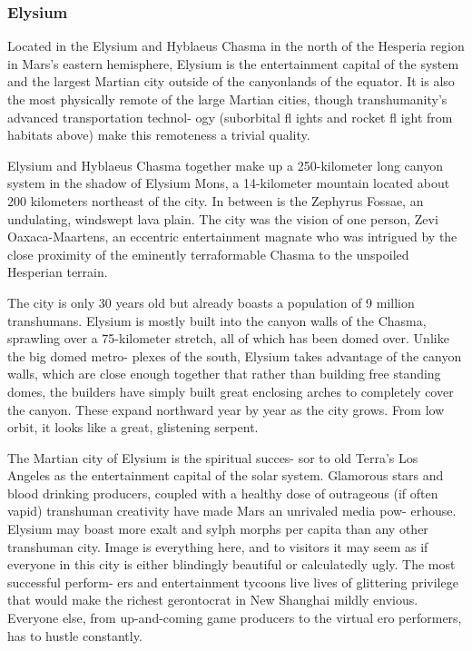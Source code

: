 \subsubsection{Elysium}

Located in the Elysium and Hyblaeus Chasma in 
the north of the Hesperia region in Mars's eastern 
hemisphere, Elysium is the entertainment capital of 
the system and the largest Martian city outside of 
the canyonlands of the equator. It is also the most 
physically remote of the large Martian cities, though 
transhumanity's advanced transportation technol-
ogy (suborbital fl ights and rocket fl ight from habitats 
above) make this remoteness a trivial quality.

Elysium and Hyblaeus Chasma together make up 
a 250-kilometer long canyon system in the shadow 
of Elysium Mons, a 14-kilometer mountain located 
about 200 kilometers northeast of the city. In between 
is the Zephyrus Fossae, an undulating, windswept 
lava plain. The city was the vision of one person, 
Zevi Oaxaca-Maartens, an eccentric entertainment 
magnate who was intrigued by the close proximity of 
the eminently terraformable Chasma to the unspoiled 
Hesperian terrain.

The city is only 30 years old but already boasts 
a population of 9 million transhumans. Elysium is 
mostly built into the canyon walls of the Chasma, 
sprawling over a 75-kilometer stretch, all of which 
has been domed over. Unlike the big domed metro-
plexes of the south, Elysium takes advantage of the 
canyon walls, which are close enough together that 
rather than building free standing domes, the builders 
have simply built great enclosing arches to completely 
cover the canyon. These expand northward year by 
year as the city grows. From low orbit, it looks like a 
great, glistening serpent.

The Martian city of Elysium is the spiritual succes-
sor to old Terra's Los Angeles as the entertainment 
capital of the solar system. Glamorous stars and 
blood drinking producers, coupled with a healthy 
dose of outrageous (if often vapid) transhuman 
creativity have made Mars an unrivaled media pow-
erhouse. Elysium may boast more exalt and sylph 
morphs per capita than any other transhuman city. 
Image is everything here, and to visitors it may seem 
as if everyone in this city is either blindingly beautiful 
or calculatedly ugly. The most successful perform-
ers and entertainment tycoons live lives of glittering 
privilege that would make the richest gerontocrat in 
New Shanghai mildly envious. Everyone else, from 
up-and-coming game producers to the virtual ero 
performers, has to hustle constantly.

